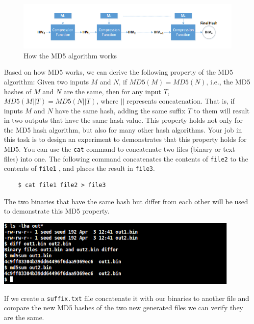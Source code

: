 \documentclass[a4paper]{article}
\begin{document}
\begin{figure}[h]
    \centering
    \includegraphics[width=\textwidth]{md5ihv.png}
    \caption{How the MD5 algorithm works}
    \label{fig:md5ihv}
\end{figure}

Based on how MD5 works, we can derive the following property of the MD5 algorithm: Given two inputs $M$ and $N$, if $MD5(M) = MD5(N)$, i.e., the MD5 hashes of $M$ and $N$ are the same, then for any input $T$, $MD5(M || T) = MD5(N || T)$, where $||$ represents concatenation. That is, if inputs $M$ and $N$ have the same hash, adding the same suffix $T$ to them will result in two outputs that have the same hash value. This property holds not only for the MD5 hash algorithm, but also for many other hash algorithms. Your job in this task is to design an experiment to demonstrates that this property holds for MD5. You can use the \texttt{cat} command to concatenate two files (binary or text files) into one. The following command concatenates the contents of \texttt{file2} to the contents of \texttt{file1} , and places the result in \texttt{file3}.

\begin{verbatim}
    $ cat file1 file2 > file3
\end{verbatim}

The two binaries that have the same hash but differ from each other will be used to demonstrate this MD5 property.

\bigskip

\includegraphics[width=0.9\textwidth]{bash/md5collgenoutcomp.png}

\bigskip

If we create a \texttt{suffix.txt} file concatenate it with our binaries to another file and compare the new MD5 hashes of the two new generated files we can verify they are the same.
\end{document}
